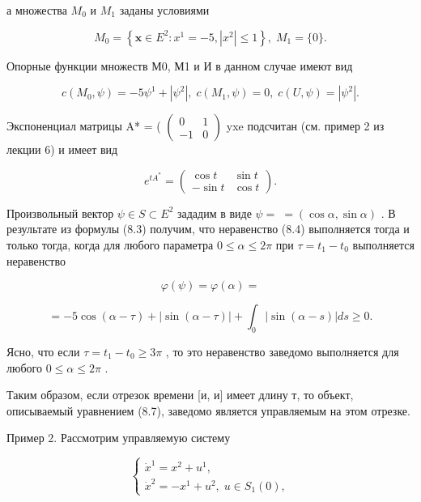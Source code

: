 \documentclass[8pt]{extarticle}
\begin{document}
а множества \({M}_{0}\) и \({M}_{1}\) заданы условиями

\[
{M}_{0} = \left\{  {\mathbf{x} \in  {E}^{2} : {x}^{1} =  - 5,\left| {x}^{2}\right|  \leq  1}\right\}  ,\;{M}_{1} = \{ 0\} .
\]

Опорные функции множеств М0, М1 и И в данном случае имеют вид

\[
c\left( {{M}_{0},\psi }\right)  =  - 5{\psi }^{1} + \left| {\psi }^{2}\right| ,\;c\left( {{M}_{1},\psi }\right)  = 0,\;c\left( {U,\psi }\right)  = \left| {\psi }^{2}\right| .
\]

Экспоненциал матрицы A* = ( \(\left( \begin{array}{rr} 0 & 1 \\   - 1 & 0 \end{array}\right)\) yxe подсчитан (см. пример 2 из лекции 6) и имеет вид

\[
{e}^{t{A}^{ * }} = \left( \begin{array}{rr} \cos t & \sin t \\   - \sin t & \cos t \end{array}\right) .
\]

Произвольный вектор \(\psi  \in  S \subset  {E}^{2}\) зададим в виде \(\psi  = \; = \left( {\cos \alpha ,\sin \alpha }\right)\) . В результате из формулы (8.3) получим, что неравенство (8.4) выполняется тогда и только тогда, когда для любого параметра \(0 \leq  \alpha  \leq  {2\pi }\) при \(\tau  = {t}_{1} - {t}_{0}\) выполняется неравенство

\[
\varphi \left( \psi \right)  = \varphi \left( \alpha \right)  =
\]

\[
=  - 5\cos \left( {\alpha  - \tau }\right)  + \left| {\sin \left( {\alpha  - \tau }\right) }\right|  + {\int }_{0}\left| {\sin \left( {\alpha  - s}\right) }\right| {ds} \geq  0.
\]

Ясно, что если \(\tau  = {t}_{1} - {t}_{0} \geq  {3\pi }\) , то это неравенство заведомо выполняется для любого \(0 \leq  \alpha  \leq  {2\pi }\) .

Таким образом, если отрезок времени [и, и] имеет длину т, то объект, описываемый уравнением (8.7), заведомо является управляемым на этом отрезке.

Пример 2. Рассмотрим управляемую систему

\[
\left\{  \begin{array}{l} {\dot{x}}^{1} = {x}^{2} + {u}^{1}, \\  {\dot{x}}^{2} =  - {x}^{1} + {u}^{2},\;u \in  {S}_{1}\left( 0\right) , \end{array}\right. \tag{8.8}
\]
\end{document}
